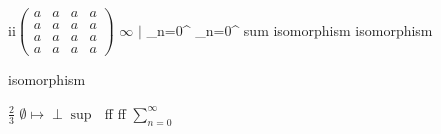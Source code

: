 ii\(\begin{pmatrix}
a & a & a & a\\
a & a & a & a\\
a & a & a & a\\
a & a & a & a
\end{pmatrix}\)
\(\infty\)
\(\big\vert\)
\sum\limits_{n=0}^{\infty}
\sum\limits_{n=0}^{\infty}
sum
isomorphism isomorphism

isomorphism

\(\frac{2}{3}\)
\text{}
\(\emptyset\)\(\mapsto \perp \sup\)
\(\)
ff ff
\(\sum\limits_{n=0}^{\infty}\)      
